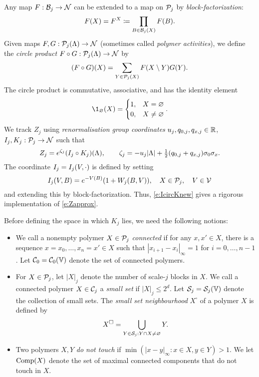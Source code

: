 Any map $F : \mathcal{B}_j \rightarrow \mathcal{N}$ can be extended to a map on $\mathcal{P}_j$ by \emph{block-factorization}:
\begin{equation}
\label{e:block-fact}
F(X) = F^X \coloneqq \prod_{B\in\mathcal{B}_j(X)} F(B).
\end{equation}
Given maps $F, G : \mathcal{P}_j(\Lambda) \rightarrow \mathcal{N}$ (sometimes called \emph{polymer activities}),
we define the \emph{circle product} $F \circ G : \mathcal{P}_j(\Lambda) \rightarrow \mathcal{N}$ by
\begin{equation}
\label{e:circ}
(F \circ G)(X) = \sum_{Y\in\mathcal{P}_j(X)} F(X \setminus Y) G(Y).
\end{equation}
The circle product is commutative, associative, and has the identity element
\begin{equation}
\1_\varnothing(X) =
\begin{cases}
1,	& X = \varnothing \\
0,	& X \ne \varnothing
\end{cases}.
\end{equation}
We track $Z_j$ using \emph{renormalisation group coordinates}
$u_j, q_{0,j}, q_{x,j} \in {\mathbb R}$,
$I_j, K_j : \mathcal{P}_j \rightarrow \mathcal{N}$ such that
\begin{equation}
\label{e:IcircKnew}
Z_j = e^{\zeta_j}(I_j\circ K_j)(\Lambda),
	\qquad
\zeta_j
	=
- u_j|\Lambda|
+ \textstyle{\frac 12} (q_{0,j} + q_{x,j}) \sigma_0\sigma_x
.
\end{equation}
The coordinate $I_j = I_j(V, \cdot)$ is defined by setting
\begin{equation}
\label{e:Idef}
I_j(V, B)
	=
e^{-V(B)} (1 + W_j(B, V)), \quad X \in \mathcal{P}_j,
	\quad
V \in \mathcal{V}
\end{equation}
and extending this by block-factorization.
Thus, \eqref{e:IcircKnew} gives a rigorous implementation of \eqref{e:Zapprox}.

Before defining the space in which $K_j$ lies, we need the following notions:
\begin{itemize}
\item
We call a nonempty polymer $X\in \mathcal{P}_j$ \emph{connected}
if for any $x, x' \in X$, there is a sequence
$x = x_0, \ldots, x_n = x' \in X$ such that
$|x_{i+1} - x_i|_\infty = 1$ for $i = 0, \ldots, n - 1$.
Let $\mathcal{C}_0 = \mathcal{C}_0(\mathbb{V})$ denote the set of connected polymers.

\item
For $X \in \mathcal{P}_j$, let $|X|_j$ denote the number of scale-$j$ blocks in $X$.
We call a connected polymer $X\in\mathcal{C}_j$ a \emph{small set} if $|X|_j \le 2^d$.
Let $\mathcal{S}_j = \mathcal{S}_j(\mathbb{V})$ denote the collection of small sets.
The \emph{small set neighbourhood} $X^\square$ of a polymer $X$ is defined by
\begin{equation}
\label{e:ssn}
X^\Box = \bigcup_{Y\in\mathcal{S}_j : Y \cap X \ne \varnothing} Y.
\end{equation}

\item
Two polymers $X, Y$ \emph{do not touch} if $\min(|x - y|_\infty : x \in X, y \in Y) > 1$.
We let ${\rm Comp}(X)$ denote the set of maximal connected components that do not touch
in $X$.
\end{itemize}

